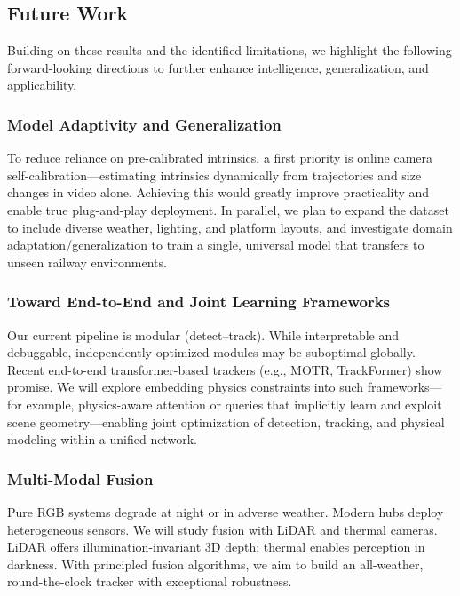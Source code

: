 \subsection{Future Work}

Building on these results and the identified limitations, we highlight the following forward-looking directions to further enhance intelligence, generalization, and applicability.

\subsubsection{Model Adaptivity and Generalization}
To reduce reliance on pre-calibrated intrinsics, a first priority is online camera self-calibration—estimating intrinsics dynamically from trajectories and size changes in video alone. Achieving this would greatly improve practicality and enable true plug-and-play deployment. In parallel, we plan to expand the dataset to include diverse weather, lighting, and platform layouts, and investigate domain adaptation/generalization to train a single, universal model that transfers to unseen railway environments.

\subsubsection{Toward End-to-End and Joint Learning Frameworks}
Our current pipeline is modular (detect–track). While interpretable and debuggable, independently optimized modules may be suboptimal globally. Recent end-to-end transformer-based trackers (e.g., MOTR, TrackFormer) show promise. We will explore embedding physics constraints into such frameworks—for example, physics-aware attention or queries that implicitly learn and exploit scene geometry—enabling joint optimization of detection, tracking, and physical modeling within a unified network.

\subsubsection{Multi-Modal Fusion}
Pure RGB systems degrade at night or in adverse weather. Modern hubs deploy heterogeneous sensors. We will study fusion with LiDAR and thermal cameras. LiDAR offers illumination-invariant 3D depth; thermal enables perception in darkness. With principled fusion algorithms, we aim to build an all-weather, round-the-clock tracker with exceptional robustness.

